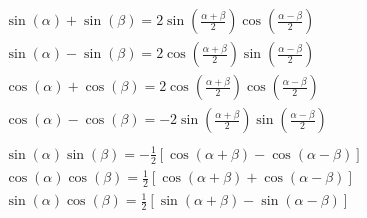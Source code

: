 \documentclass[preview,convert={density=300,outext=.png}]{standalone}
\begin{document}
\begin{align*}
    & \sin(\alpha) + \sin(\beta) = 2\sin(\frac{\alpha + \beta}{2})\cos(\frac{\alpha - \beta}{2}) \\
    & \sin(\alpha) - \sin(\beta) = 2\cos(\frac{\alpha + \beta}{2})\sin(\frac{\alpha - \beta}{2}) \\
    & \cos(\alpha) + \cos(\beta) = 2\cos(\frac{\alpha + \beta}{2})\cos(\frac{\alpha - \beta}{2}) \\
    & \cos(\alpha) - \cos(\beta) = -2\sin(\frac{\alpha + \beta}{2})\sin(\frac{\alpha - \beta}{2}) \\
    & \\
    & \sin(\alpha)\sin(\beta) = -\frac{1}{2}[\cos(\alpha + \beta) - \cos(\alpha - \beta)] \\
    & \cos(\alpha)\cos(\beta) = \frac{1}{2}[\cos(\alpha + \beta) + \cos(\alpha - \beta)] \\
    & \sin(\alpha)\cos(\beta) = \frac{1}{2}[\sin(\alpha + \beta) - \sin(\alpha - \beta)] \\
\end{align*}
\end{document}
